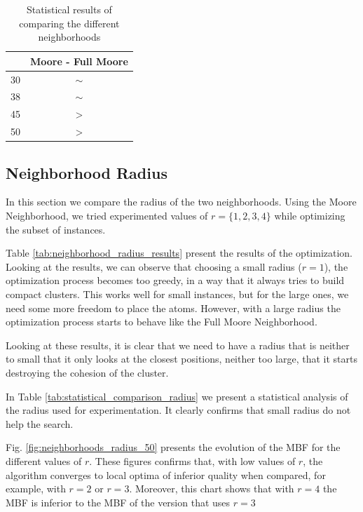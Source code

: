		\begin{table}[!htdp]
				\begin{center}
					\begin{tabular}{| c | c |}
						\hline
						~ & \textbf{Moore - Full Moore} \\ \hline
						30 & $\sim$ \\ \hline
						38 & $\sim$ \\ \hline
						45 & > \\ \hline
						50 & > \\ \hline
					\end{tabular}
					\caption{Statistical results of comparing the different neighborhoods}
					\label{tab:statistical_comparison_neighborhoods}
				\end{center}
		\end{table}
		
		\pagebreak
		\subsection{Neighborhood Radius}
		
		In this section we compare the radius of the two neighborhoods. Using the Moore Neighborhood, we tried experimented values of $r = \{1, 2, 3, 4\}$ while optimizing the subset of instances.
		
		Table \ref{tab:neighborhood_radius_results} present the results of the optimization. Looking at the results, we can observe that choosing a small radius ($r=1$), the optimization process becomes too greedy, in a way that it always tries to build compact clusters. This works well for small instances, but for the large ones, we need some more freedom to place the atoms. However, with a large radius the optimization process starts to behave like the Full Moore Neighborhood. 
		
		Looking at these results, it is clear that we need to have a radius that is neither to small that it only looks at the closest positions, neither too large, that it starts destroying the cohesion of the cluster.
		
		In Table \ref{tab:statistical_comparison_radius} we present a statistical analysis of the radius used for experimentation. It clearly confirms that small radius do not help the search.
		
		Fig. \ref{fig:neighborhoods_radius_50} presents the evolution of the MBF for the different values of $r$. These figures confirms that, with low values of $r$, the algorithm converges to local optima of inferior quality when compared, for example, with $r=2$ or $r=3$. Moreover, this chart shows that with $r=4$ the MBF is inferior to the MBF of the version that uses $r=3$
		
